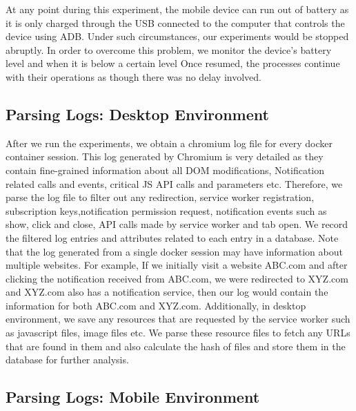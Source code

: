 At any point during this experiment, the mobile device can run out of battery as it is only charged through the USB connected to the computer  that controls the device using ADB. Under such circumstances, our experiments would be stopped abruptly. In order to overcome this problem, we monitor the device's battery level and when it is below a certain level  Once resumed, the processes continue with their operations as though there was no delay involved. 

\subsection{Parsing Logs: Desktop Environment}
After we run the experiments, we obtain a chromium log file for every docker container session. This log generated by Chromium is very detailed as they contain fine-grained information about all DOM modifications, Notification related calls and events, critical JS
API calls and parameters etc. Therefore, we parse the log file to filter out any redirection, service worker registration, subscription keys,notification permission request, notification events such as show, click and close, API calls made by service worker and tab open. We record the filtered log entries and attributes related to each entry in a database. Note that the log generated from a single docker session may have information about multiple websites. For example, If we initially visit a website ABC.com and after clicking the notification received from ABC.com, we were redirected to XYZ.com and XYZ.com also has a notification service, then our log would contain the information for both ABC.com and XYZ.com. Additionally, in desktop environment, we save any resources that are requested by the service worker such as javascript files, image files etc. We parse these resource files to fetch any URLs that are found in them and also calculate the hash of files and store them in the database for further analysis.


\subsection{Parsing Logs: Mobile Environment}
